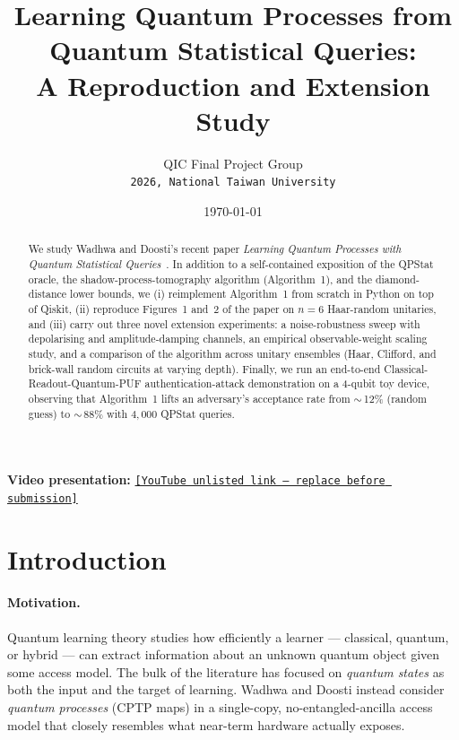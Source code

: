 \documentclass[11pt]{article}
\title{
  Learning Quantum Processes from Quantum Statistical Queries:\\
  A Reproduction and Extension Study
}
\author{
  QIC Final Project Group\\
  \texttt{2026, National Taiwan University}
}
\date{\today}
\begin{document}
\maketitle

\begin{center}
  \textbf{Video presentation:} \href{https://www.youtube.com/UNLISTED-LINK-HERE}{\texttt{[YouTube unlisted link --- replace before submission]}}
\end{center}

\begin{abstract}
  We study Wadhwa and Doosti's recent paper \emph{Learning Quantum
  Processes with Quantum Statistical Queries}~\cite{wadhwa2024qpsq}.
  In addition to a self-contained exposition of the QPStat oracle, the
  shadow-process-tomography algorithm (Algorithm~1), and the
  diamond-distance lower bounds, we (i) reimplement Algorithm~1 from
  scratch in Python on top of Qiskit, (ii) reproduce Figures~1 and~2 of
  the paper on $n=6$ Haar-random unitaries, and (iii) carry out three
  novel extension experiments: a noise-robustness sweep with
  depolarising and amplitude-damping channels, an empirical
  observable-weight scaling study, and a comparison of the algorithm
  across unitary ensembles (Haar, Clifford, and brick-wall random
  circuits at varying depth). Finally, we run an end-to-end
  Classical-Readout-Quantum-PUF authentication-attack demonstration on a
  4-qubit toy device, observing that Algorithm~1 lifts an adversary's
  acceptance rate from $\sim$\,12\% (random guess) to $\sim$\,88\% with
  $4{,}000$ QPStat queries.
\end{abstract}

\section{Introduction}\label{sec:intro}

\paragraph{Motivation.}
Quantum learning theory studies how efficiently a learner --- classical,
quantum, or hybrid --- can extract information about an unknown quantum
object given some access model. The bulk of the literature has focused
on \emph{quantum states} as both the input and the target of learning.
Wadhwa and Doosti instead consider \emph{quantum processes} (CPTP maps)
in a single-copy, no-entangled-ancilla access model that closely
resembles what near-term hardware actually exposes.
\end{document}
